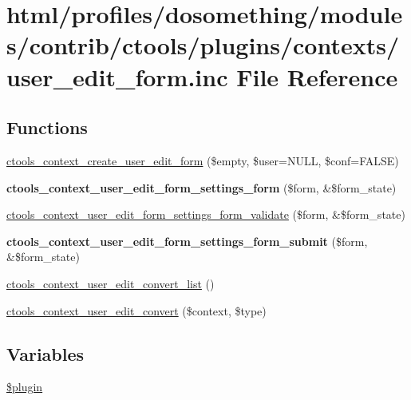 \hypertarget{user__edit__form_8inc}{
\section{html/profiles/dosomething/modules/contrib/ctools/plugins/contexts/user\_\-edit\_\-form.inc File Reference}
\label{user__edit__form_8inc}
}
\subsection*{Functions}
\begin{DoxyCompactItemize}
\item 
\hyperlink{user__edit__form_8inc_a7fe780a0756ef2a10866ac3c11426ee7}{ctools\_\-context\_\-create\_\-user\_\-edit\_\-form} (\$empty, \$user=NULL, \$conf=FALSE)
\item 
\hypertarget{user__edit__form_8inc_a1756fd2e626aaa851bc3de36639e8bc2}{
{\bfseries ctools\_\-context\_\-user\_\-edit\_\-form\_\-settings\_\-form} (\$form, \&\$form\_\-state)}
\label{user__edit__form_8inc_a1756fd2e626aaa851bc3de36639e8bc2}

\item 
\hyperlink{user__edit__form_8inc_ac3bf848949d1f5d7913b27bb53c26c0c}{ctools\_\-context\_\-user\_\-edit\_\-form\_\-settings\_\-form\_\-validate} (\$form, \&\$form\_\-state)
\item 
\hypertarget{user__edit__form_8inc_a2ba9b136a70dc046a58c94a47248c576}{
{\bfseries ctools\_\-context\_\-user\_\-edit\_\-form\_\-settings\_\-form\_\-submit} (\$form, \&\$form\_\-state)}
\label{user__edit__form_8inc_a2ba9b136a70dc046a58c94a47248c576}

\item 
\hyperlink{user__edit__form_8inc_a961f6f629f3ba7c8ac2ba09b098f436c}{ctools\_\-context\_\-user\_\-edit\_\-convert\_\-list} ()
\item 
\hyperlink{user__edit__form_8inc_a46277399c3f62b388d6d24236d39e6fa}{ctools\_\-context\_\-user\_\-edit\_\-convert} (\$context, \$type)
\end{DoxyCompactItemize}
\subsection*{Variables}
\begin{DoxyCompactItemize}
\item 
\hyperlink{user__edit__form_8inc_ada8a7130088351710bb02ed622d6bf65}{\$plugin}
\end{DoxyCompactItemize}


